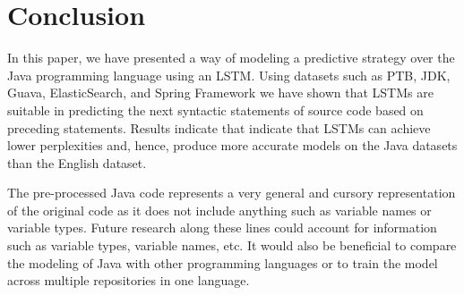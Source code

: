 \documentclass[runningheads,a4paper]{llncs}
\begin{document}
\section{Conclusion}

In this paper, we have presented a way of modeling a predictive strategy
over the Java programming language using an LSTM. Using datasets such as PTB,
JDK, Guava, ElasticSearch, and Spring Framework we have shown that
LSTMs are suitable in predicting the next syntactic statements of source
code based on preceding statements. Results indicate that indicate
that LSTMs can achieve lower perplexities and, hence, produce more accurate models
on the Java datasets than the English dataset.

The pre-processed Java code represents a very general and cursory
representation of the original code as it does not include anything such
as variable names or variable types. Future research along these lines
could account for information such as variable types, variable names, etc.
It would also be beneficial to compare the modeling of Java with other
programming languages or to train the model across multiple repositories
in one language.
\end{document}
